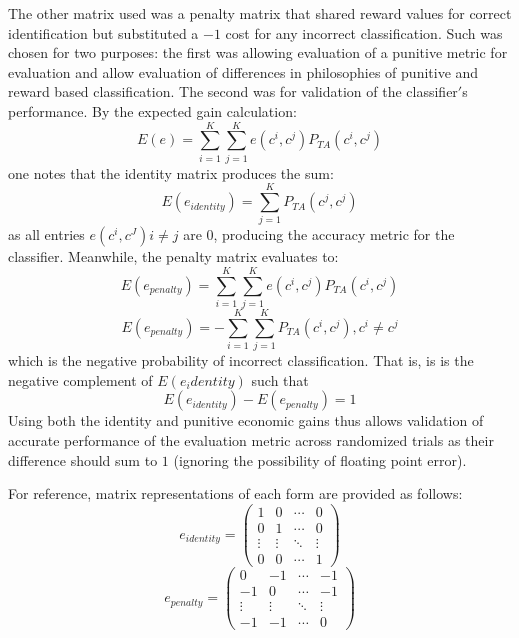 \documentclass[10pt, conference]{IEEEtran}
\begin{document}
The other matrix used was a penalty matrix that shared reward values for correct identification but substituted a $-1$ cost for any incorrect classification. Such was chosen for two purposes: the first was allowing evaluation of a punitive metric for evaluation and allow evaluation of differences in philosophies of punitive and reward based classification. The second was for validation of the classifier$'$s performance. By the expected gain calculation:
\begin{equation}
E(e) =  \sum_{i=1}^K \sum_{j=1}^K e(c^i,c^j)P_{TA}(c^i, c^j)
\end{equation}
one notes that the identity matrix produces the sum:
\begin{equation}
E(e_{identity}) =  \sum_{j=1}^K P_{TA}(c^j, c^j)
\end{equation}
as all entries $e(c^i,c^J) i \neq j$ are 0, producing the accuracy metric for the classifier. Meanwhile, the penalty matrix evaluates to:
\begin{equation*}
E(e_{penalty}) =  \sum_{i=1}^K \sum_{j=1}^K e(c^i,c^j)P_{TA}(c^i, c^j) 
\end{equation*}
\begin{equation}
E(e_{penalty}) =  -\sum_{i=1}^K \sum_{j=1}^K P_{TA}(c^i, c^j) , c^i \neq c^j
\end{equation}
which is the negative probability of incorrect classification. That is, is is the negative complement of $E(e_identity)$ such that
\begin{equation}
E(e_{identity}) - E(e_{penalty}) = 1 
\end{equation}
Using both the identity and punitive economic gains thus allows validation of accurate performance of the evaluation metric across randomized trials as their difference should sum to $1$ (ignoring the possibility of floating point error).

For reference, matrix representations of each form are provided as follows:
\begin{equation}
e_{identity} = 
\begin{pmatrix}
1 & 0 & \cdots & 0 \\
0 & 1 & \cdots & 0 \\
\vdots  & \vdots  & \ddots & \vdots  \\
0 & 0 & \cdots & 1 
\end{pmatrix}
\end{equation}
\begin{equation}
e_{penalty} = 
\begin{pmatrix}
0 & -1 & \cdots & -1 \\
-1 & 0  & \cdots & -1 \\
\vdots  & \vdots  & \ddots & \vdots  \\
-1 & -1 & \cdots & 0
\end{pmatrix}
\end{equation}
\end{document}
